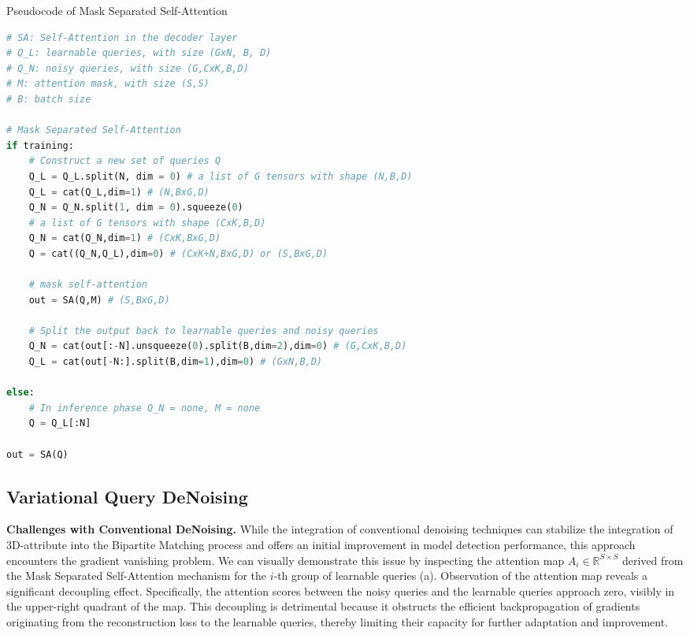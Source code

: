 \begin{algorithm}[h]
\caption{Pseudocode of Mask Separated Self-Attention}
\label{alg:mask_separated_self_attention}
\begin{lstlisting}[language=python]
# SA: Self-Attention in the decoder layer
# Q_L: learnable queries, with size (GxN, B, D)
# Q_N: noisy queries, with size (G,CxK,B,D)
# M: attention mask, with size (S,S)
# B: batch size

# Mask Separated Self-Attention
if training:
    # Construct a new set of queries Q
    Q_L = Q_L.split(N, dim = 0) # a list of G tensors with shape (N,B,D)
    Q_L = cat(Q_L,dim=1) # (N,BxG,D)
    Q_N = Q_N.split(1, dim = 0).squeeze(0) 
    # a list of G tensors with shape (CxK,B,D)
    Q_N = cat(Q_N,dim=1) # (CxK,BxG,D)
    Q = cat((Q_N,Q_L),dim=0) # (CxK+N,BxG,D) or (S,BxG,D)

    # mask self-attention
    out = SA(Q,M) # (S,BxG,D)

    # Split the output back to learnable queries and noisy queries
    Q_N = cat(out[:-N].unsqueeze(0).split(B,dim=2),dim=0) # (G,CxK,B,D)
    Q_L = cat(out[-N:].split(B,dim=1),dim=0) # (GxN,B,D)
    
else:   
    # In inference phase Q_N = none, M = none
    Q = Q_L[:N]
    
out = SA(Q)
\end{lstlisting}
\end{algorithm}


\subsection{Variational Query DeNoising}
\textbf{Challenges with Conventional DeNoising.} While the integration of conventional denoising techniques can stabilize the integration of 3D-attribute into the Bipartite Matching process and offers an initial improvement in model detection performance, this approach encounters the gradient vanishing problem. We can visually demonstrate this issue by inspecting the attention map \(A_i \in \mathbb{R}^{S \times S}\) derived from the Mask Separated Self-Attention mechanism for the \(i\)-th group of learnable queries (a). Observation of the attention map reveals a significant decoupling effect. Specifically, the attention scores between the noisy queries and the learnable queries approach zero, visibly in the upper-right quadrant of the map. This decoupling is detrimental because it obstructs the efficient backpropagation of gradients originating from the reconstruction loss to the learnable queries, thereby limiting their capacity for further adaptation and improvement.

